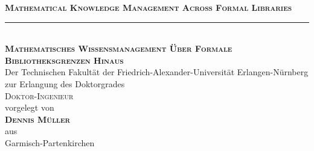 \documentclass[a4paper,11pt]{book}
\begin{document}


\newcommand{\titel}{Mathematical Knowledge Management Across Formal Libraries}
\newcommand{\titelde}{Mathematisches Wissensmanagement Über Formale Bibliotheksgrenzen Hinaus }
\newcommand{\myname}{Dennis Müller}
\newcommand{\advisor}{Prof. Dr. Michael Kohlhase}
\newcommand{\HRule}{\vspace{-0.3cm}\rule{.8\linewidth}{0.5mm}}

\begin{titlepage}
\begin{center}


{\huge
\textbf{\textsc{\titel}}} \\[.2cm] \HRule \\[.2cm]
{\huge
\textbf{\textsc{\titelde}}}\\[1cm]
Der Technischen Fakultät der Friedrich-Alexander-Universität Erlangen-Nürnberg zur Erlangung des Doktorgrades\\
{\Large\textsc{Doktor-Ingenieur}}\\[8mm]
vorgelegt von \\
\Large
\textbf{\textsc{\myname}} \\
aus\\ Garmisch-Partenkirchen

\vspace*{1.5cm}



\vfill


\end{center}
\end{titlepage}
\end{document}
